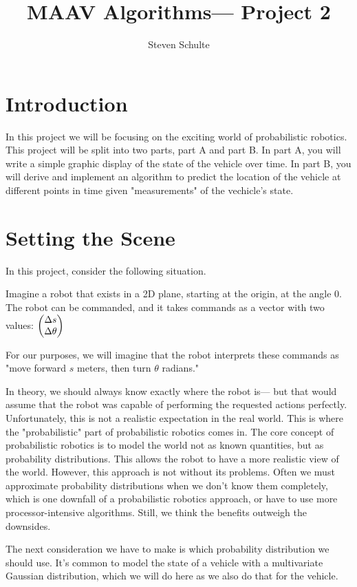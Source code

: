 \documentclass[12pt]{article}
\title{MAAV Algorithms— Project 2}
\author{Steven Schulte}
\date{}
\newcommand*\colvec[3][]{
	\begin{pmatrix}\ifx\relax#1\relax\else#1\\\fi#2\\#3\end{pmatrix}
}
\begin{document}
\maketitle

\section{Introduction}

In this project we will be focusing on the exciting world of probabilistic robotics. This project will be split into two parts, part A and part B. In part A, you will write a simple graphic display of the state of the vehicle over time. In part B, you will derive and implement an algorithm to predict the location of the vehicle at different points in time given "measurements" of the vechicle's state.

\section{Setting the Scene}

In this project, consider the following situation.

Imagine a robot that exists in a 2D plane, starting at the origin, at the angle $0$. The robot can be commanded, and it takes commands as a vector with two values: $\colvec{\Delta s}{\Delta \theta}$

For our purposes, we will imagine that the robot interprets these commands as "move forward $s$ meters, then turn $\theta$ radians."

In theory, we should always know exactly where the robot is— but that would assume that the robot was capable of performing the requested actions perfectly. Unfortunately, this is not a realistic expectation in the real world. This is where the "probabilistic" part of probabilistic robotics comes in. The core concept of probabilistic robotics is to model the world not as known quantities, but as probability distributions. This allows the robot to have a more realistic view of the world. However, this approach is not without its problems. Often we must approximate probability distributions when we don't know them completely, which is one downfall of a probabilistic robotics approach, or have to use more processor-intensive algorithms. Still, we think the benefits outweigh the downsides.

The next consideration we have to make is which probability distribution we should use. It's common to model the state of a vehicle with a multivariate Gaussian distribution, which we will do here as we also do that for the vehicle.
\end{document}
